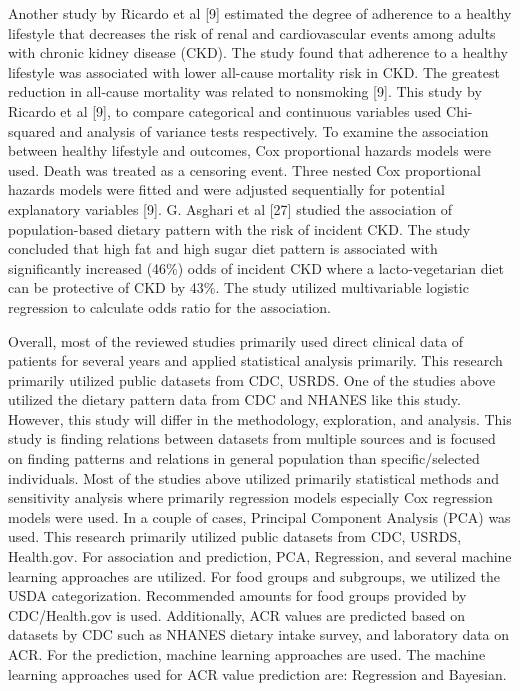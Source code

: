 \medskip
\noindent Another study by Ricardo et al [9] estimated the degree of adherence to a healthy lifestyle that decreases the risk of renal and cardiovascular events among adults with chronic kidney disease (CKD). The study found that adherence to a healthy lifestyle was associated with lower all-cause mortality risk in CKD. The greatest reduction in all-cause mortality was related to nonsmoking [9]. This study by Ricardo et al [9], to compare categorical and continuous variables used Chi-squared and analysis of variance tests respectively. To examine the association between healthy lifestyle and outcomes, Cox proportional hazards models were used. Death was treated as a censoring event. Three nested Cox proportional hazards models were fitted and were adjusted sequentially for potential explanatory variables [9]. G. Asghari et al [27] studied the association of population-based dietary pattern with the risk of incident CKD. The study concluded that high fat and high sugar diet pattern is associated with significantly increased (46\%) odds of incident CKD where a lacto-vegetarian diet can be protective of CKD by 43\%. The study utilized multivariable logistic regression to calculate odds ratio for the association.

\medskip
\noindent  Overall, most of the reviewed studies primarily used direct clinical data of patients for several years and applied statistical analysis primarily. This research primarily utilized public datasets from CDC, USRDS.  One of the studies above utilized the dietary pattern data from CDC and NHANES like this study. However, this study will differ in the methodology, exploration, and analysis. This study is finding relations between datasets from multiple sources and is focused on finding patterns and relations in general population than specific/selected individuals. Most of the studies above utilized primarily statistical methods and sensitivity analysis where primarily regression models especially Cox regression models were used. In a couple of cases, Principal Component Analysis (PCA) was used. This research primarily utilized public datasets from CDC, USRDS, Health.gov. For association and prediction, PCA, Regression, and several machine learning approaches are utilized. For food groups and subgroups,  we utilized the USDA categorization. Recommended amounts for food groups provided by CDC/Health.gov is used. Additionally, ACR values are predicted based on datasets by CDC such as NHANES dietary intake survey, and laboratory data on ACR. For the prediction, machine learning approaches are used.  The machine learning approaches used for ACR value prediction are: Regression and Bayesian.